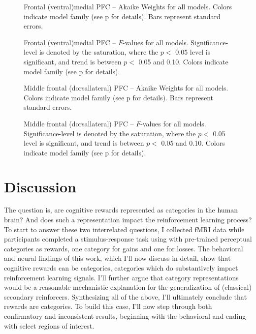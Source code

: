 \documentclass[doc,12pt]{apa}        %
\begin{document}
\begin{figure}[tp]
    \centering
    \caption{Frontal (ventral)medial PFC -- Akaike Weights for all models.  Colors indicate model family (see p\pageref{sub:cmb} for details). Bars represent standard errors.}
	\label{fig:vmpfc}
\end{figure}
\begin{figure}[tp]
    \centering
    \caption{Frontal (ventral)medial PFC -- $F$-values for all models.
    Significance-level is denoted by the saturation, where the $p <$ 0.05 level is
    significant, and trend is between $p <$ 0.05 and 0.10.  Colors indicate model family (see p\pageref{sub:cmb} for details).}
	\label{fig:fvalvmpfc}
\end{figure}

\begin{figure}[tp]
    \centering
    \caption{Middle frontal (dorsallateral) PFC -- Akaike Weights for all models.  Colors indicate model family (see p\pageref{sub:cmb} for details). Bars represent standard errors.}
	\label{fig:dlpfc}
\end{figure}
\begin{figure}[tp]
    \centering
    \caption{Middle frontal (dorsallateral) PFC -- $F$-values for all models.
    Significance-level is denoted by the saturation, where the $p <$ 0.05 level is
    significant, and trend is between $p <$ 0.05 and 0.10.  Colors indicate model family (see p\pageref{sub:cmb} for details).}
	\label{fig:fvaldlpfc}
\end{figure}
\clearpage

\newpage
\section{Discussion} %
\label{sec:dicussion}
The question is, are cognitive rewards represented as categories in the human brain?  And does such a representation impact the reinforcement learning process?  To start to answer these two interrelated questions, I collected fMRI data while participants completed a stimulus-response task using with pre-trained perceptual categories as rewards, one category for gains and one for losses.  The behavioral and neural findings of this work, which I'll now discuss in detail, show that cognitive rewards can be categories, categories which do substantively impact reinforcement learning signals.  I'll further argue that category representations would be a reasonable mechanistic explanation for the generalization of (classical) secondary reinforcers.  Synthesizing all of the above, I'll ultimately conclude that rewards are categories.  To build this case, I'll now step through both confirmatory and inconsistent results, beginning with the behavioral and ending with select regions of interest.
\end{document}
